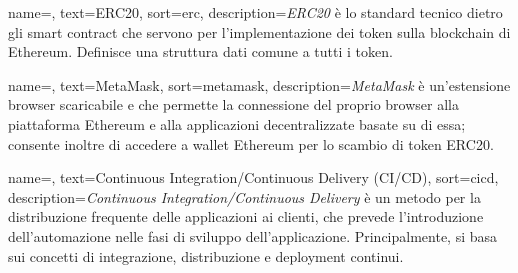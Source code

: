 {
    name=,
    text=ERC20,
    sort=erc,
    description={\emph{ERC20} è lo standard tecnico dietro gli smart contract che servono per l'implementazione dei token sulla blockchain di Ethereum. Definisce una struttura dati comune a tutti i token.}
}

{
    name=,
    text=MetaMask,
    sort=metamask,
    description={\emph{MetaMask} è un'estensione browser scaricabile e che permette la connessione del proprio browser alla piattaforma Ethereum e alla applicazioni decentralizzate basate su di essa; consente inoltre di accedere a wallet Ethereum per lo scambio di token ERC20.}
}

{
    name=,
    text=Continuous Integration/Continuous Delivery (CI/CD),
    sort=cicd,
    description={\emph{Continuous Integration/Continuous Delivery} è un metodo per la distribuzione frequente delle applicazioni ai clienti, che prevede l’introduzione dell’automazione nelle fasi di sviluppo dell’applicazione. Principalmente, si basa sui concetti di integrazione, distribuzione e deployment continui.}
}